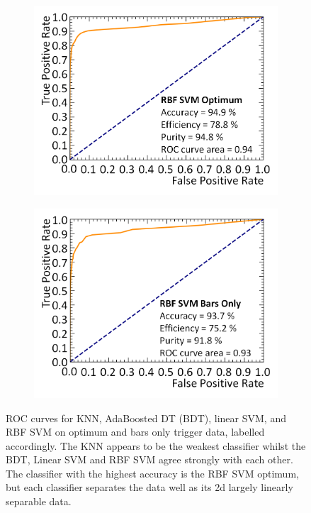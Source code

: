 \begin{figure}[!h]
\begin{subfigure}{.4\textwidth}
  \includegraphics[width=\linewidth]{Chapter4.5/Figs/rbfSvmOptimumRoc.png}
  \captionsetup{width=.9\linewidth}
  \caption{}
  \label{subFig:linSvmBarsOnlyRoc}
\end{subfigure}
\qquad
\begin{subfigure}{.4\textwidth}
  \centering
  \includegraphics[width=\linewidth]{Chapter4.5/Figs/rbfSvmBarsOnlyRoc.png}
  \captionsetup{width=.9\linewidth}
  \caption{}
  \label{subFig:rbfSvmBarsOnlyRoc}
\end{subfigure}
\caption[ROC curves for KNN, AdaBoosted DT (BDT), linear SVM, and RBF SVM on optimum and bars only trigger data.]{ROC curves for KNN, AdaBoosted DT (BDT), linear SVM, and RBF SVM on optimum and bars only trigger data, labelled accordingly. The KNN appears to be the weakest classifier whilst the BDT, Linear SVM and RBF SVM agree strongly with each other. The classifier with the highest accuracy is the RBF SVM optimum, but each classifier separates the data well as its 2d largely linearly separable data.}
\label{fig:rocCurvesKnnBdtSvm}
\end{figure}

